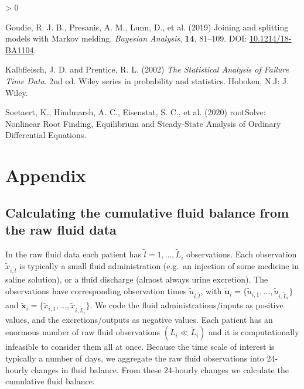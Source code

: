 \documentclass[
  10pt,
  a4paper,
]{article}
\newlength{\cslhangindent}
\newenvironment{CSLReferences}[2] %
 {%
  \setlength{\parindent}{0pt}
  \ifodd #1 \everypar{\setlength{\hangindent}{\cslhangindent}}\ignorespaces\fi
  \ifnum #2 > 0
  \setlength{\parskip}{#2\baselineskip}
  \fi
 }%
 {}
\begin{document}
\begin{CSLReferences}{1}{0}
\leavevmode\hypertarget{ref-goudie_joining_2019}{}%
Goudie, R. J. B., Presanis, A. M., Lunn, D., et al. (2019) Joining and
splitting models with {Markov} melding. \emph{Bayesian Analysis},
\textbf{14}, 81--109. DOI:
\href{https://doi.org/10.1214/18-BA1104}{10.1214/18-BA1104}.

\leavevmode\hypertarget{ref-kalbfleisch_statistical_2002}{}%
Kalbfleisch, J. D. and Prentice, R. L. (2002) \emph{The Statistical
Analysis of Failure Time Data}. 2nd ed. Wiley series in probability and
statistics. {Hoboken, N.J}: {J. Wiley}.

\leavevmode\hypertarget{ref-soetaert_rootsolve_2020}{}%
Soetaert, K., Hindmarsh, A. C., Eisenstat, S. C., et al. (2020)
{rootSolve}: {Nonlinear Root Finding}, {Equilibrium} and {Steady}-{State
Analysis} of {Ordinary Differential Equations}.

\end{CSLReferences}

\renewcommand{\thesubsection}{\Alph{subsection}}

\hypertarget{appendix}{%
\section*{Appendix}\label{appendix}}

\hypertarget{calculating-the-cumulative-fluid-balance-from-the-raw-fluid-data}{%
\subsection{Calculating the cumulative fluid balance from the raw fluid
data}\label{calculating-the-cumulative-fluid-balance-from-the-raw-fluid-data}}

In the raw fluid data each patient has
\(\tilde{l} = 1, \ldots, \tilde{L}_{i}\) observations. Each observation
\(\tilde{x}_{i, \tilde{l}}\) is typically a small fluid administration
(e.g.~an injection of some medicine in saline solution), or a fluid
discharge (almost always urine excretion). The observations have
corresponding observation times \(\tilde{u}_{i, \tilde{l}}\), with
\(\tilde{\boldsymbol{u}}_{i} = \{\tilde{u}_{i, 1}, \ldots, \tilde{u}_{i, \tilde{L}_{i}}\}\)
and
\(\tilde{\boldsymbol{x}}_{i} = \{\tilde{x}_{i, 1}, \ldots, \tilde{x}_{i, \tilde{L}_{i}}\}\).
We code the fluid administrations/inputs as positive values, and the
excretions/outputs as negative values. Each patient has an enormous
number of raw fluid observations \((L_{i} \ll \tilde{L}_{i})\) and it is
computationally infeasible to consider them all at once. Because the
time scale of interest is typically a number of days, we aggregate the
raw fluid observations into 24-hourly changes in fluid balance. From
these 24-hourly changes we calculate the cumulative fluid balance.
\end{document}

